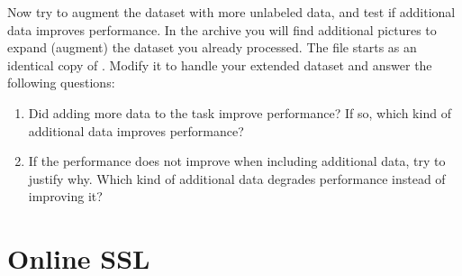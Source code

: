 \documentclass{article}
\begin{document}
	
	Now try to augment the dataset with more unlabeled data, and test if additional
	data improves performance. In the archive 
	you will find additional pictures to expand (augment) the dataset you already processed.
	The file  starts as an identical copy of . Modify it to handle your extended dataset and answer the following questions:
	
	\begin{enumerate}[resume]
		\item Did adding more data to the task improve performance? If so,
		which kind of additional data improves performance?
		\item If the performance does not improve when including additional
		data, try to justify why. Which kind of additional data degrades performance	instead of improving it?
	\end{enumerate}



\section{Online SSL}
\end{document}
